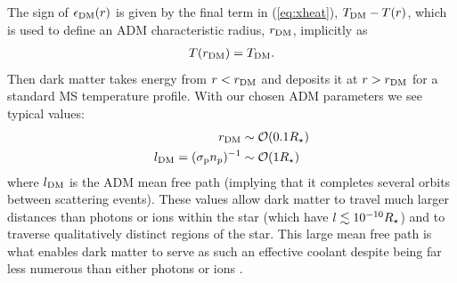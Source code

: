 \documentclass[useAMS,usenatbib]{mnras}
\begin{document}
  The sign of $\epsilon_{\mathrm{DM}}(r)$ is given by the final term in (\ref{eq:xheat}), $T_{\mathrm{DM}} - T(r)$, which is used to define an ADM characteristic radius, $r_{\mathrm{DM}}$, implicitly as
  \begin{align}
    T(r_{\mathrm{DM}}) = T_{\mathrm{DM}}.
  \end{align}
  Then dark matter takes energy from $r < r_{\mathrm{DM}}$ and deposits it at $r > r_{\mathrm{DM}}$ for a standard MS temperature profile. With our chosen ADM parameters we see typical values:
  \begin{align}
    r_{\mathrm{DM}} & \sim \mathcal{O}(0.1 R_{\star}) \\
    l_{\mathrm{DM}} = (\sigma_{\mathrm{p}} n_p)^{-1} & \sim\mathcal{O}(1 R_{\star})
  \end{align}
   
  where $l_{\mathrm{DM}}$ is the ADM mean free path (implying that it completes several orbits between scattering events). These values allow dark matter to travel much larger distances than photons or ions within the star (which have $l \lesssim 10^{-10} R_{\star}$) and to traverse qualitatively distinct
  regions of the star. This large mean free path is what enables dark matter
  to serve as such an effective coolant despite being far less numerous than either photons or ions \citep{Press1985EffectInterior}.  






\end{document}
